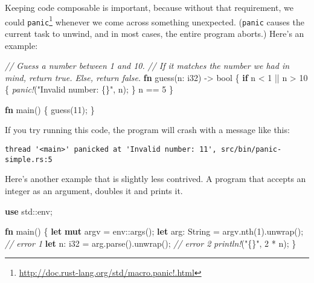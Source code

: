\documentclass[a4paper,]{book}
\newenvironment{Shaded}{\begin{snugshade}}{\end{snugshade}}
\newcommand{\KeywordTok}[1]{\textcolor[rgb]{0.13,0.29,0.53}{\textbf{{#1}}}}
\newcommand{\DataTypeTok}[1]{\textcolor[rgb]{0.13,0.29,0.53}{{#1}}}
\newcommand{\DecValTok}[1]{\textcolor[rgb]{0.00,0.00,0.81}{{#1}}}
\newcommand{\StringTok}[1]{\textcolor[rgb]{0.31,0.60,0.02}{{#1}}}
\newcommand{\CommentTok}[1]{\textcolor[rgb]{0.56,0.35,0.01}{\textit{{#1}}}}
\newcommand{\PreprocessorTok}[1]{\textcolor[rgb]{0.56,0.35,0.01}{\textit{{#1}}}}
\newcommand{\NormalTok}[1]{{#1}}
\renewcommand{\href}[2]{#2\footnote{\url{#1}}}
\begin{document}
Keeping code composable is important, because without that requirement,
we could
\href{http://doc.rust-lang.org/std/macro.panic!.html}{\texttt{panic}}
whenever we come across something unexpected. (\texttt{panic} causes the
current task to unwind, and in most cases, the entire program aborts.)
Here's an example:

\begin{Shaded}
\begin{Highlighting}[]
\CommentTok{// Guess a number between 1 and 10.}
\CommentTok{// If it matches the number we had in mind, return true. Else, return false.}
\KeywordTok{fn} \NormalTok{guess(n: }\DataTypeTok{i32}\NormalTok{) -> }\DataTypeTok{bool} \NormalTok{\{}
    \KeywordTok{if} \NormalTok{n < }\DecValTok{1} \NormalTok{|| n > }\DecValTok{10} \NormalTok{\{}
        \PreprocessorTok{panic!}\NormalTok{(}\StringTok{"Invalid number: \{\}"}\NormalTok{, n);}
    \NormalTok{\}}
    \NormalTok{n == }\DecValTok{5}
\NormalTok{\}}

\KeywordTok{fn} \NormalTok{main() \{}
    \NormalTok{guess(}\DecValTok{11}\NormalTok{);}
\NormalTok{\}}
\end{Highlighting}
\end{Shaded}

If you try running this code, the program will crash with a message like
this:

\begin{verbatim}
thread '<main>' panicked at 'Invalid number: 11', src/bin/panic-simple.rs:5
\end{verbatim}

Here's another example that is slightly less contrived. A program that
accepts an integer as an argument, doubles it and prints it.

\protect\hypertarget{code-unwrap-double}{}{}

\begin{Shaded}
\begin{Highlighting}[]
\KeywordTok{use} \NormalTok{std::env;}

\KeywordTok{fn} \NormalTok{main() \{}
    \KeywordTok{let} \KeywordTok{mut} \NormalTok{argv = env::args();}
    \KeywordTok{let} \NormalTok{arg: }\DataTypeTok{String} \NormalTok{= argv.nth(}\DecValTok{1}\NormalTok{).unwrap(); }\CommentTok{// error 1}
    \KeywordTok{let} \NormalTok{n: }\DataTypeTok{i32} \NormalTok{= arg.parse().unwrap(); }\CommentTok{// error 2}
    \PreprocessorTok{println!}\NormalTok{(}\StringTok{"\{\}"}\NormalTok{, }\DecValTok{2} \NormalTok{* n);}
\NormalTok{\}}
\end{Highlighting}
\end{Shaded}
\end{document}
